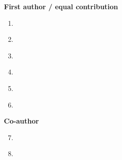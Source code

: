


\begin{cvparagraph}
\textbf{First author / equal contribution}

\begin{enumerate}
\item {}\label{paper:diffusion}
\item {}\label{paper:midl}
\item {}\label{paper:uncertainty}
\item {}\label{paper:hopping}
\item {}\label{paper:inter}
\item {}\label{paper:quantifiable}
\end{enumerate}

\textbf{Co-author}
\begin{enumerate}
\setcounter{enumi}{6}
\item {}\label{paper:covid}
\item {}\label{paper:nature}
\end{enumerate}
\end{cvparagraph}
